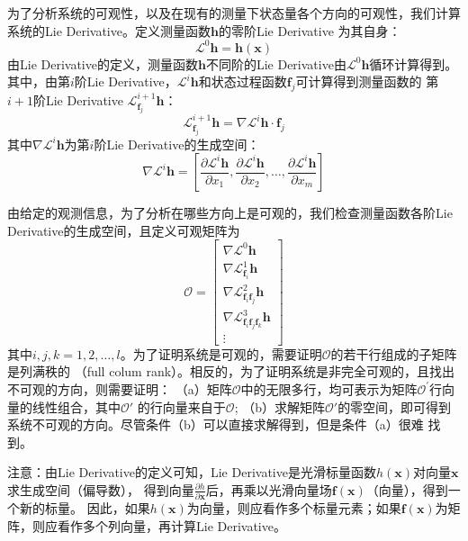 \documentclass{article}
\begin{document}
为了分析系统的可观性，以及在现有的测量下状态量各个方向的可观性，我们计算系统的Lie Derivative。定义测量函数$\textbf{h}$的零阶Lie Derivative
为其自身：
\begin{equation}
    \mathcal{L}^0\textbf{h}=\textbf{h}(\textbf{x})
\end{equation}
由Lie Derivative的定义，测量函数$\textbf{h}$不同阶的Lie Derivative由$\mathcal{L}^0\textbf{h}$循环计算得到。
其中，由第$i$阶Lie Derivative，$\mathcal{L}^i\textbf{h}$和状态过程函数$\textbf{f}_j$可计算得到测量函数的
第$i+1$阶Lie Derivative $\mathcal{L}_{\textbf{f}_j}^{i+1}\textbf{h}$：
\begin{equation}
    \mathcal{L}_{\textbf{f}_j}^{i+1}\textbf{h}=\nabla\mathcal{L}^i\textbf{h}\cdot\textbf{f}_j
\end{equation}
其中$\nabla\mathcal{L}^i\textbf{h}$为第$i$阶Lie Derivative的生成空间：
\begin{equation}
    \nabla\mathcal{L}^i\textbf{h}=\left[\frac{\partial\mathcal{L}^i\textbf{h}}{\partial{x_1}},
    \frac{\partial\mathcal{L}^i\textbf{h}}{\partial{x_2}},\dots,
    \frac{\partial\mathcal{L}^i\textbf{h}}{\partial{x_m}}
    \right]
\end{equation}
\par

由给定的观测信息，为了分析在哪些方向上是可观的，我们检查测量函数各阶Lie Derivative的生成空间，且定义可观矩阵为
\begin{equation}
    \mathcal{O}=
    \left[ \begin{array}{c}
        \nabla\mathcal{L}^0\textbf{h}\\
        \nabla\mathcal{L}_{\textbf{f}_i}^{1}\textbf{h}\\
        \nabla\mathcal{L}_{\textbf{f}_i\textbf{f}_j}^{2}\textbf{h}\\
        \nabla\mathcal{L}_{\textbf{f}_i\textbf{f}_j\textbf{f}_k}^{3}\textbf{h}\\
        \vdots
    \end{array}\right]
\end{equation}
其中$i,j,k=1,2,\dots,l$。为了证明系统是可观的，需要证明$\mathcal{O}$的若干行组成的子矩阵是列满秩的
（full colum rank）。相反的，为了证明系统是非完全可观的，且找出不可观的方向，则需要证明：
（a）矩阵$\mathcal{O}$中的无限多行，均可表示为矩阵$\mathcal{O}^\prime$行向量的线性组合，其中$\mathcal{O}\prime$
的行向量来自于$\mathcal{O}$;
（b）求解矩阵$\mathcal{O}\prime$的零空间，即可得到系统不可观的方向。尽管条件（b）可以直接求解得到，但是条件（a）很难
找到。
\par
{\color{red}注意：由Lie Derivative的定义可知，Lie Derivative是光滑标量函数$h(\textbf{x})$对向量$\textbf{x}$求生成空间（偏导数），
得到向量$\frac{\partial{h}}{\partial\textbf{x}}$后，再乘以光滑向量场$\textbf{f}(\textbf{x})$（向量），得到一个新的标量。
因此，如果$h(\textbf{x})$为向量，则应看作多个标量元素；如果$\textbf{f}(\textbf{x})$为矩阵，则应看作多个列向量，再计算Lie Derivative。}
\end{document}
